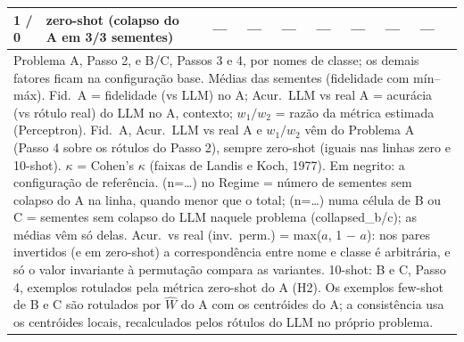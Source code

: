 \begin{table}[htbp]
\begin{tabular}{llrrrrrrrr}
\midrule
1 / 0 & zero-shot (colapso do A em 3/3 sementes) & — & — & — & — & — & — & — \\
\bottomrule
\multicolumn{10}{p{0.95\linewidth}}{\footnotesize Problema A, Passo 2, e B/C, Passos 3 e 4, por nomes de classe; os demais fatores ficam na configuração base. Médias das sementes (fidelidade com mín–máx). Fid.\ A = fidelidade (vs LLM) no A; Acur.\ LLM vs real A = acurácia (vs rótulo real) do LLM no A, contexto; $w_1/w_2$ = razão da métrica estimada (Perceptron). Fid.\ A, Acur.\ LLM vs real A e $w_1/w_2$ vêm do Problema A (Passo 4 sobre os rótulos do Passo 2), sempre zero-shot (iguais nas linhas zero e 10-shot). $\kappa$ = Cohen's $\kappa$ (faixas de Landis e Koch, 1977). Em negrito: a configuração de referência. (n=…) no Regime = número de sementes sem colapso do A na linha, quando menor que o total; (n=…) numa célula de B ou C = sementes sem colapso do LLM naquele problema (collapsed\_b/c); as médias vêm só delas. Acur.\ vs real (inv.\ perm.) = max($a$, 1 $-$ $a$): nos pares invertidos (e em zero-shot) a correspondência entre nome e classe é arbitrária, e só o valor invariante à permutação compara as variantes. 10-shot: B e C, Passo 4, exemplos rotulados pela métrica zero-shot do A (H2). Os exemplos few-shot de B e C são rotulados por $\hat{W}$ do A com os centróides do A; a consistência usa os centróides locais, recalculados pelos rótulos do LLM no próprio problema.} \\
\end{tabular}
\end{table}
